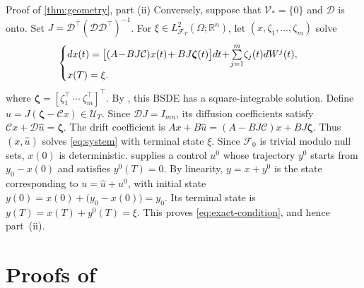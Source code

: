 \documentclass[twocolumn]{autart}
\newcounter{part}
\begin{document}
\begin{pf*}{Proof of \cref{thm:geometry}, part \textup{(ii)}}
Conversely, suppose that $\mathcal V_*=\{0\}$ and $\mathcal D$ is onto.
Set $J=\mathcal D^\top(\mathcal D\mathcal D^\top)^{-1}$. For
$\xi\in L^2_{\mathcal F_T}(\Omega;\mathbb R^n)$, let
$(x,\zeta_1,\dots,\zeta_m)$ solve\vspace{-3mm}
\begin{equation*}
\begin{cases}
dx(t) =\bigl[(A\!-\!BJ\mathcal C)x(t)\!+BJ\boldsymbol\zeta(t)\bigr]dt \!+\!\sum\limits_{j=1}^m\!\zeta_j(t) dW^j(t),\\[2pt] x(T)=\xi.
\end{cases}\vspace{-2mm}
\end{equation*}
where $\boldsymbol\zeta=[\zeta_1^\top\ \cdots\ \zeta_m^\top]^\top$.
By \cite[Theorem~4.2]{Lue2021a}, this BSDE has a square-integrable
solution. Define $\widehat u=J(\boldsymbol\zeta-\mathcal Cx)\in\mathcal U_T$.
Since $\mathcal DJ=I_{mn}$, its diffusion coefficients satisfy
$
\mathcal Cx+\mathcal D\widehat u=\boldsymbol\zeta.
$
The drift coefficient is
$
Ax+B\widehat u=(A-BJ\mathcal C)x+BJ\boldsymbol\zeta.
$
Thus $(x,\widehat u)$ solves \cref{eq:system} with terminal state $\xi$.
Since $\mathcal F_0$ is trivial modulo null sets, $x(0)$ is
deterministic.  supplies a control $u^0$ whose
trajectory $y^0$ starts from $y_0-x(0)$ and satisfies $y^0(T)=0$.
By linearity, $y=x+y^0$ is the state corresponding to
$u=\widehat u+u^0$, with initial state
$
y(0)=x(0)+\bigl(y_0-x(0)\bigr)=y_0.
$
Its terminal state is $y(T)=x(T)+y^0(T)=\xi$. This proves
\cref{eq:exact-condition}, and hence part~(ii).
\end{pf*}

\vspace{-2mm}


\section{Proofs of \texorpdfstring{}{the rank criteria}}\label{sec:rank}
\end{document}
